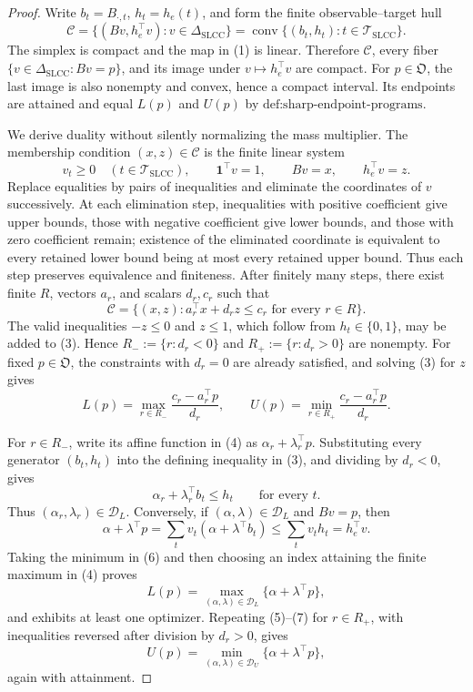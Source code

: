 \documentclass{article}
\begin{document}
\begin{proof}
Write \(b_t=B_{\cdot,t}\), \(h_t=h_e(t)\), and form the finite observable--target hull
\[
\mathcal C=\{(Bv,h_e^{\top}v):v\in\Delta_{\mathrm{SLCC}}\}
=\operatorname{conv}\{(b_t,h_t):t\in\mathcal T_{\mathrm{SLCC}}\}.
\tag{1}
\]
The simplex is compact and the map in (1) is linear.  Therefore \(\mathcal C\), every fiber \(\{v\in\Delta_{\mathrm{SLCC}}:Bv=p\}\), and its image under \(v\mapsto h_e^{\top}v\) are compact.  For \(p\in\mathfrak O\), the last image is also nonempty and convex, hence a compact interval.  Its endpoints are attained and equal \(L(p)\) and \(U(p)\) by \(\text{def:sharp-endpoint-programs}\).

We derive duality without silently normalizing the mass multiplier.  The membership condition \((x,z)\in\mathcal C\) is the finite linear system
\[
v_t\geq0\quad(t\in\mathcal T_{\mathrm{SLCC}}),
\qquad
\mathbf 1^{\top}v=1,
\qquad
Bv=x,
\qquad
h_e^{\top}v=z.
\tag{2}
\]
Replace equalities by pairs of inequalities and eliminate the coordinates of \(v\) successively.  At each elimination step, inequalities with positive coefficient give upper bounds, those with negative coefficient give lower bounds, and those with zero coefficient remain; existence of the eliminated coordinate is equivalent to every retained lower bound being at most every retained upper bound.  Thus each step preserves equivalence and finiteness.  After finitely many steps, there exist finite \(R\), vectors \(a_r\), and scalars \(d_r,c_r\) such that
\[
\mathcal C=\{(x,z):a_r^{\top}x+d_rz\leq c_r\text{ for every }r\in R\}.
\tag{3}
\]
The valid inequalities \(-z\leq0\) and \(z\leq1\), which follow from \(h_t\in\{0,1\}\), may be added to (3).  Hence \(R_-:=\{r:d_r<0\}\) and \(R_+:=\{r:d_r>0\}\) are nonempty.  For fixed \(p\in\mathfrak O\), the constraints with \(d_r=0\) are already satisfied, and solving (3) for \(z\) gives
\[
L(p)=\max_{r\in R_-}\frac{c_r-a_r^{\top}p}{d_r},
\qquad
U(p)=\min_{r\in R_+}\frac{c_r-a_r^{\top}p}{d_r}.
\tag{4}
\]

For \(r\in R_-\), write its affine function in (4) as \(\alpha_r+\lambda_r^{\top}p\).  Substituting every generator \((b_t,h_t)\) into the defining inequality in (3), and dividing by \(d_r<0\), gives
\[
\alpha_r+\lambda_r^{\top}b_t\leq h_t
\qquad\text{for every }t.
\tag{5}
\]
Thus \((\alpha_r,\lambda_r)\in\mathcal D_L\).  Conversely, if \((\alpha,\lambda)\in\mathcal D_L\) and \(Bv=p\), then
\[
\alpha+\lambda^{\top}p
=\sum_t v_t(\alpha+\lambda^{\top}b_t)
\leq\sum_tv_th_t=h_e^{\top}v.
\tag{6}
\]
Taking the minimum in (6) and then choosing an index attaining the finite maximum in (4) proves
\[
L(p)=\max_{(\alpha,\lambda)\in\mathcal D_L}
\{\alpha+\lambda^{\top}p\},
\tag{7}
\]
and exhibits at least one optimizer.  Repeating (5)--(7) for \(r\in R_+\), with inequalities reversed after division by \(d_r>0\), gives
\[
U(p)=\min_{(\alpha,\lambda)\in\mathcal D_U}
\{\alpha+\lambda^{\top}p\},
\tag{8}
\]
again with attainment.


\end{proof}
\end{document}
